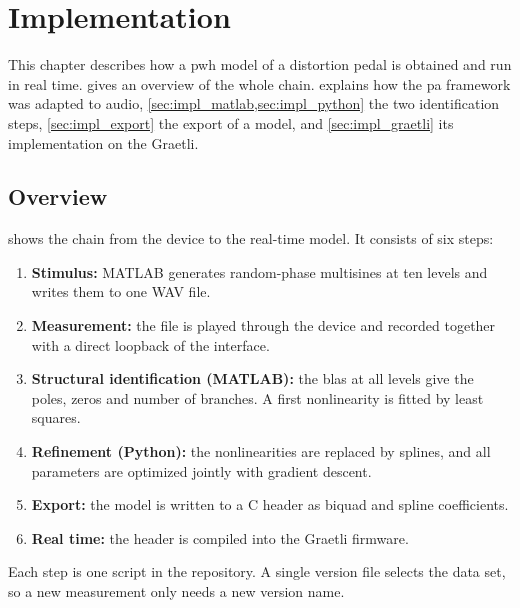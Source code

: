 


\chapter{Implementation}
\label{ch:implementation}

This chapter describes how a \gls{pwh} model of a distortion pedal is obtained and run in real time.  gives an overview of the whole chain.  explains how the \gls{pa} framework was adapted to audio, \cref{sec:impl_matlab,sec:impl_python} the two identification steps, \cref{sec:impl_export} the export of a model, and \cref{sec:impl_graetli} its implementation on the Graetli.


\section{Overview}
\label{sec:impl_overview}

 shows the chain from the device to the real-time model. It consists of six steps:
\begin{enumerate}
  \item \textbf{Stimulus:} MATLAB generates random-phase multisines at ten levels and writes them to one WAV file.
  \item \textbf{Measurement:} the file is played through the device and recorded together with a direct loopback of the interface.
  \item \textbf{Structural identification (MATLAB):} the \glspl{bla} at all levels give the poles, zeros and number of branches. A first nonlinearity is fitted by least squares.
  \item \textbf{Refinement (Python):} the nonlinearities are replaced by splines, and all parameters are optimized jointly with gradient descent.
  \item \textbf{Export:} the model is written to a C header as biquad and spline coefficients.
  \item \textbf{Real time:} the header is compiled into the Graetli firmware.
\end{enumerate}
Each step is one script in the repository. A single version file selects the data set, so a new measurement only needs a new version name.

